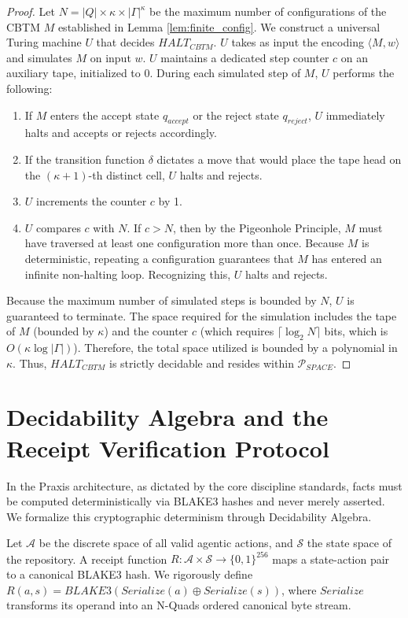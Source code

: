 \begin{proof}
Let $N = |Q| \times \kappa \times |\Gamma|^\kappa$ be the maximum number of configurations of the CBTM $M$ established in Lemma \ref{lem:finite_config}. We construct a universal Turing machine $U$ that decides $HALT_{CBTM}$. $U$ takes as input the encoding $\langle M, w \rangle$ and simulates $M$ on input $w$. 
$U$ maintains a dedicated step counter $c$ on an auxiliary tape, initialized to $0$. 
During each simulated step of $M$, $U$ performs the following:
\begin{enumerate}
    \item If $M$ enters the accept state $q_{accept}$ or the reject state $q_{reject}$, $U$ immediately halts and accepts or rejects accordingly.
    \item If the transition function $\delta$ dictates a move that would place the tape head on the $(\kappa+1)$-th distinct cell, $U$ halts and rejects.
    \item $U$ increments the counter $c$ by 1.
    \item $U$ compares $c$ with $N$. If $c > N$, then by the Pigeonhole Principle, $M$ must have traversed at least one configuration more than once. Because $M$ is deterministic, repeating a configuration guarantees that $M$ has entered an infinite non-halting loop. Recognizing this, $U$ halts and rejects.
\end{enumerate}
Because the maximum number of simulated steps is bounded by $N$, $U$ is guaranteed to terminate. The space required for the simulation includes the tape of $M$ (bounded by $\kappa$) and the counter $c$ (which requires $\lceil \log_2 N \rceil$ bits, which is $O(\kappa \log |\Gamma|)$). Therefore, the total space utilized is bounded by a polynomial in $\kappa$. Thus, $HALT_{CBTM}$ is strictly decidable and resides within $\mathcal{P}_{SPACE}$.
\end{proof}

\section{Decidability Algebra and the Receipt Verification Protocol}

In the Praxis architecture, as dictated by the core discipline standards, facts must be computed deterministically via BLAKE3 hashes and never merely asserted. We formalize this cryptographic determinism through Decidability Algebra.

\begin{definition}
\label{def:receipt_function}
Let $\mathcal{A}$ be the discrete space of all valid agentic actions, and $\mathcal{S}$ the state space of the repository. A receipt function $R: \mathcal{A} \times \mathcal{S} \rightarrow \{0, 1\}^{256}$ maps a state-action pair to a canonical BLAKE3 hash. We rigorously define $R(a, s) = BLAKE3(Serialize(a) \oplus Serialize(s))$, where $Serialize$ transforms its operand into an N-Quads ordered canonical byte stream.
\end{definition}

